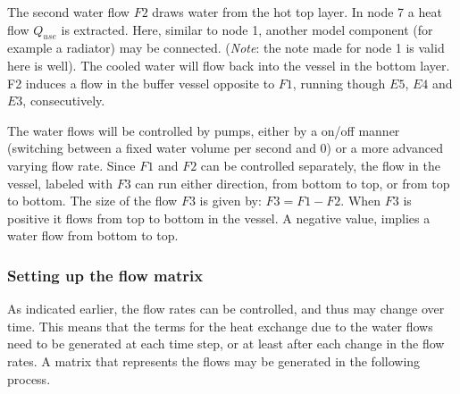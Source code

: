 The second water flow $F2$ draws water from the hot top layer. In node 7 a heat flow $Q_{use}$ is extracted. Here, similar to node 1, another model component (for example a radiator) may be connected. (\emph{Note}: the note made for node 1 is valid here is well). 
The cooled water will flow back into the vessel in the bottom layer. F2 induces a flow in the buffer vessel opposite to $F1$, running though $E5$, $E4$ and $E3$,  consecutively. 

The water flows will be controlled by pumps, either by a on/off manner (switching between a fixed water volume per second and 0) or a more advanced varying flow rate. 
Since $F1$ and $F2$ can be controlled separately, the flow in the vessel, labeled with $F3$ can run either direction, from bottom to top, or from top to bottom. The size of the flow $F3$ is given by: $F3 = F1 - F2$. When $F3$ is positive it flows from top to bottom in the vessel. A negative value, implies a water flow from bottom to top. 


\subsubsection{Setting up the flow matrix}\label{s:flow_matrices}
As indicated earlier, the flow rates can be controlled, and thus may change over time. This means that the terms for the heat exchange due to the water flows need to be generated at each time step, or at least after each change in the flow rates. A matrix that represents the flows may be generated in the following process.

